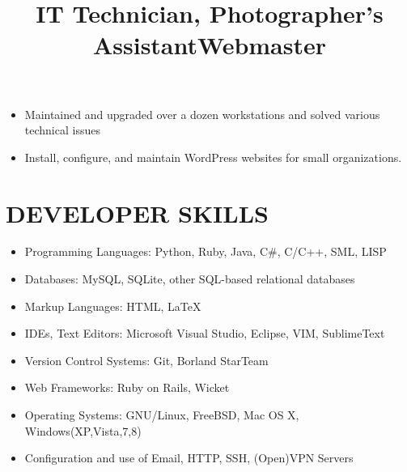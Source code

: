 \documentclass[line, overlapped]{res}
\begin{document}
\begin{resume}
    \title{IT Technician, Photographer's Assistant}
    \begin{position}
        \begin{itemize}
            \item Maintained and upgraded over a dozen workstations and solved various technical issues
        \end{itemize}
    \end{position}

    \title{Webmaster}
    \begin{position}
        \begin{itemize}
            \item Install, configure, and maintain WordPress websites for small organizations.
        \end{itemize}
    \end{position}

	\section{DEVELOPER SKILLS}

	\begin{itemize}[leftmargin=10pt]
		\item Programming Languages:  Python, Ruby, Java, C\#, C/C++, SML, LISP
        \item Databases: MySQL, SQLite, other SQL-based relational databases
        \item Markup Languages:  HTML, \LaTeX
        \item IDEs, Text Editors:  Microsoft Visual Studio, Eclipse, VIM, SublimeText
        \item Version Control Systems:  Git, Borland StarTeam
        \item Web Frameworks:  Ruby on Rails, Wicket
	    \item Operating Systems:  GNU/Linux, FreeBSD, Mac OS X, Windows(XP,Vista,7,8)
	    \item Configuration and use of Email, HTTP, SSH, (Open)VPN Servers
	\end{itemize}



\end{resume}
\end{document}
